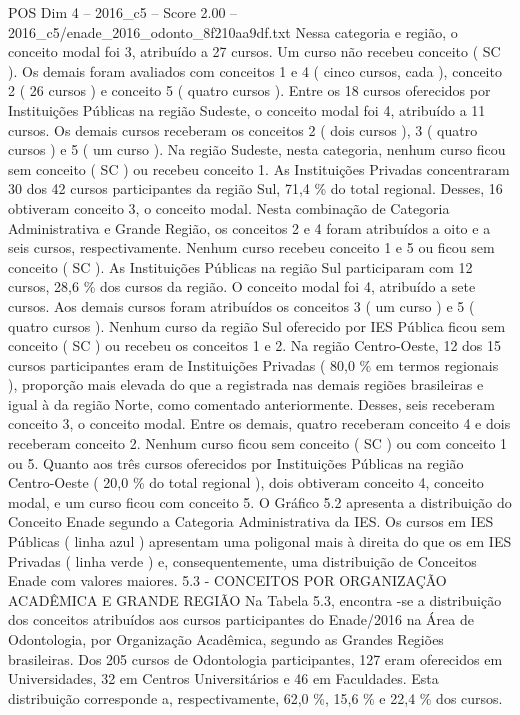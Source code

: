 \begin{textsample}{POS Dim 4 – 2016\_c5 – Score 2.00 – 2016\_c5/enade\_2016\_odonto\_8f210aa9df.txt}
Nessa categoria e região, o conceito modal foi 3, atribuído a 27 cursos.
Um curso não recebeu conceito ( SC ).
Os demais foram avaliados com conceitos 1 e 4 ( cinco cursos, cada ), conceito 2 ( 26 cursos ) e conceito 5 ( quatro cursos ).
Entre os 18 cursos oferecidos por Instituições Públicas na região Sudeste, o conceito modal foi 4, atribuído a 11 cursos.
Os demais cursos receberam os conceitos 2 ( dois cursos ), 3 ( quatro cursos ) e 5 ( um curso ).
Na região Sudeste, nesta categoria, nenhum curso ficou sem conceito ( SC ) ou recebeu conceito 1.
As Instituições Privadas concentraram 30 dos 42 cursos participantes da região Sul, 71,4 \% do total regional.
Desses, 16 obtiveram conceito 3, o conceito modal.
Nesta combinação de Categoria Administrativa e Grande Região, os conceitos 2 e 4 foram atribuídos a oito e a seis cursos, respectivamente.
Nenhum curso recebeu conceito 1 e 5 ou ficou sem conceito ( SC ).
As Instituições Públicas na região Sul participaram com 12 cursos, 28,6 \% dos cursos da região.
O conceito modal foi 4, atribuído a sete cursos.
Aos demais cursos foram atribuídos os conceitos 3 ( um curso ) e 5 ( quatro cursos ).
Nenhum curso da região Sul oferecido por IES Pública ficou sem conceito ( SC ) ou recebeu os conceitos 1 e 2.
Na região Centro-Oeste, 12 dos 15 cursos participantes eram de Instituições Privadas ( 80,0 \% em termos regionais ), proporção mais elevada do que a registrada nas demais regiões brasileiras e igual à da região Norte, como comentado anteriormente.
Desses, seis receberam conceito 3, o conceito modal.
Entre os demais, quatro receberam conceito 4 e dois receberam conceito 2.
Nenhum curso ficou sem conceito ( SC ) ou com conceito 1 ou 5.
Quanto aos três cursos oferecidos por Instituições Públicas na região Centro-Oeste ( 20,0 \% do total regional ), dois obtiveram conceito 4, conceito modal, e um curso ficou com conceito 5.
O Gráfico 5.2 apresenta a distribuição do Conceito Enade segundo a Categoria Administrativa da IES.
Os cursos em IES Públicas ( linha azul ) apresentam uma poligonal mais à direita do que os em IES Privadas ( linha verde ) e, consequentemente, uma distribuição de Conceitos Enade com valores maiores. 5.3 - CONCEITOS POR ORGANIZAÇÃO ACADÊMICA E GRANDE REGIÃO Na Tabela 5.3, encontra -se a distribuição dos conceitos atribuídos aos cursos participantes do Enade/2016 na Área de Odontologia, por Organização Acadêmica, segundo as Grandes Regiões brasileiras.
Dos 205 cursos de Odontologia participantes, 127 eram oferecidos em Universidades, 32 em Centros Universitários e 46 em Faculdades.
Esta distribuição corresponde a, respectivamente, 62,0 \%, 15,6 \% e 22,4 \% dos cursos.

\end{textsample}
